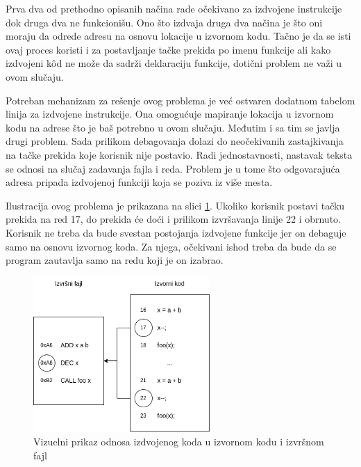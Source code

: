 \documentclass[12pt,oneside]{memoir}
\begin{document}
Prva dva od prethodno opisanih načina rade očekivano za izdvojene instrukcije dok druga dva ne funkcionišu.
Ono što izdvaja druga dva načina je što oni moraju da odrede adresu na osnovu lokacije u izvornom kodu.
Tačno je da se isti ovaj proces koristi i za postavljanje tačke prekida po imenu funkcije ali kako izdvojeni k\^od ne može da sadrži deklaraciju funkcije, dotični problem ne važi u ovom slučaju.

Potreban mehanizam za rešenje ovog problema je već ostvaren dodatnom tabelom linija za izdvojene instrukcije.
Ona omogućuje mapiranje lokacija u izvornom kodu na adrese što je baš potrebno u ovom slučaju.
Međutim i sa tim se javlja drugi problem.
Sada prilikom debagovanja dolazi do neočekivanih zastajkivanja na tačke prekida koje korisnik nije postavio.
Radi jednostavnosti, nastavak teksta se odnosi na slučaj zadavanja fajla i reda.
Problem je u tome što odgovarajuća adresa pripada izdvojenoj funkciji koja se poziva iz više mesta.

Ilustracija ovog problema je prikazana na slici \ref{fig:outlined_breakpoint}.
Ukoliko korisnik postavi tačku prekida na red 17, do prekida će doći i prilikom izvršavanja linije 22 i obrnuto.
Korisnik ne treba da bude svestan postojanja izdvojene funkcije jer on debaguje samo na osnovu izvornog koda.
Za njega, očekivani ishod treba da bude da se program zautavlja samo na redu koji je on izabrao.

\begin{figure}[!ht]
  \centering
  \includegraphics[width=0.6\textwidth]{assets/outlining_breakpoint.png}
  \caption{Vizuelni prikaz odnosa izdvojenog koda u izvornom kodu i izvršnom fajl}
  \label{fig:outlined_breakpoint}
\end{figure}
\end{document}
